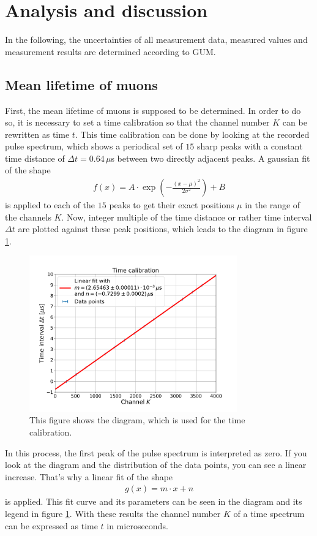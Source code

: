 \section{Analysis and discussion}

In the following, the uncertainties of all measurement data, measured values and measurement results are determined according to GUM\cite{gum}.

\subsection{Mean lifetime of muons}

First, the mean lifetime of muons is supposed to be determined.
In order to do so, it is necessary to set a time calibration so that the channel number $K$ can be rewritten as time $t$.
This time calibration can be done by looking at the recorded pulse spectrum, which shows a periodical set of $15$ sharp peaks with a constant time distance of $\Delta t=0.64\,\mu$s between two directly adjacent peaks.
A gaussian fit of the shape
\begin{align} \label{Gaussian}
f(x)=A\cdot\exp\left( -\frac{(x-\mu)^2}{2\sigma ^2}\right) + B
\end{align}
\noindent is applied to each of the $15$ peaks to get their exact positions $\mu$ in the range of the channels $K$.
Now, integer multiple of the time distance or rather time interval $\Delta t$ are plotted against these peak positions, which leads to the diagram in figure \ref{TimeCalibration}.
\begin{figure}[H]
	\centering
	\includegraphics[width=0.8\textwidth]{src/TimeCalibration}
	\caption{This figure shows the diagram, which is used for the time calibration.}
	\label{TimeCalibration}
\end{figure}
\noindent In this process, the first peak of the pulse spectrum is interpreted as zero.
If you look at the diagram and the distribution of the data points, you can see a linear increase.
That's why a linear fit of the shape 
\begin{align} \label{line}
g(x)=m\cdot x + n
\end{align}
\noindent is applied.
This fit curve and its parameters can be seen in the diagram and its legend in figure \ref{TimeCalibration}.
With these results the channel number $K$ of a time spectrum can be expressed as time $t$ in microseconds.


